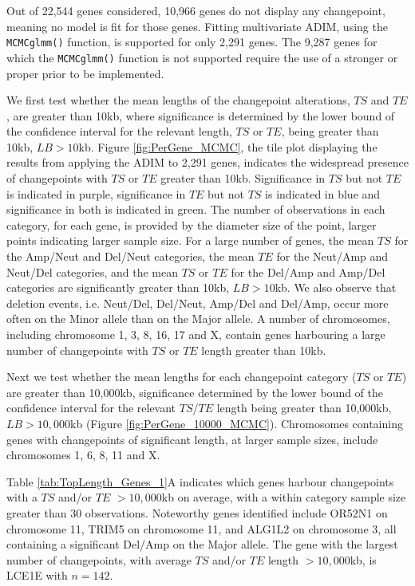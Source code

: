 Out of 22,544 genes considered, 10,966 genes do not display any changepoint, meaning no model is fit for those genes. Fitting multivariate ADIM, using the \texttt{MCMCglmm()} function, is supported for only 2,291 genes. The 9,287 genes for which the \texttt{MCMCglmm()} function is not supported require the use of a stronger or proper prior to be implemented. 

We first test whether the mean lengths of the changepoint alterations, $TS$ and $TE$, are greater than 10kb, where significance is determined by the lower bound of the confidence interval for the relevant length, $TS$ or $TE$, being greater than 10kb, $LB > 10$kb. Figure \ref{fig:PerGene_MCMC}, the tile plot displaying the results from applying the ADIM to 2,291 genes, indicates the widespread presence of changepoints with $TS$ or $TE$ greater than 10kb. Significance in $TS$ but not $TE$ is indicated in purple, significance in $TE$ but not $TS$ is indicated in blue and significance in both is indicated in green. The number of observations in each category, for each gene, is provided by the diameter size of the point, larger points indicating larger sample size. For a large number of genes, the mean $TS$ for the Amp/Neut and Del/Neut categories, the mean $TE$ for the Neut/Amp and Neut/Del categories, and the mean $TS$ or $TE$ for the Del/Amp and Amp/Del categories are significantly greater than 10kb, $LB > 10$kb. We also observe that deletion events, i.e. Neut/Del, Del/Neut, Amp/Del and Del/Amp, occur more often on the Minor allele than on the Major allele. A number of chromosomes, including chromosome 1, 3, 8, 16, 17 and X, contain genes harbouring a large number of changepoints with $TS$ or $TE$ length greater than 10kb.

Next we test whether the mean lengths for each changepoint category ($TS$ or $TE$) are greater than 10,000kb, significance determined by the lower bound of the confidence interval for the relevant $TS$/$TE$ length being greater than 10,000kb, $LB > 10,000$kb (Figure \ref{fig:PerGene_10000_MCMC}). Chromosomes containing genes with changepoints of significant length, at larger sample sizes, include chromosomes 1, 6, 8, 11 and X.

Table \ref{tab:TopLength_Genes_1}A indicates which genes harbour changepoints with a $TS$ and/or $TE$ $>10,000$kb on average, with a within category sample size greater than 30 observations. Noteworthy genes identified include OR52N1 on chromosome 11, TRIM5 on chromosome 11, and ALG1L2 on chromosome 3, all containing a significant Del/Amp on the Major allele. The gene with the largest number of changepoints, with average $TS$ and/or $TE$ length $>10,000$kb, is LCE1E with $n = 142$. 


